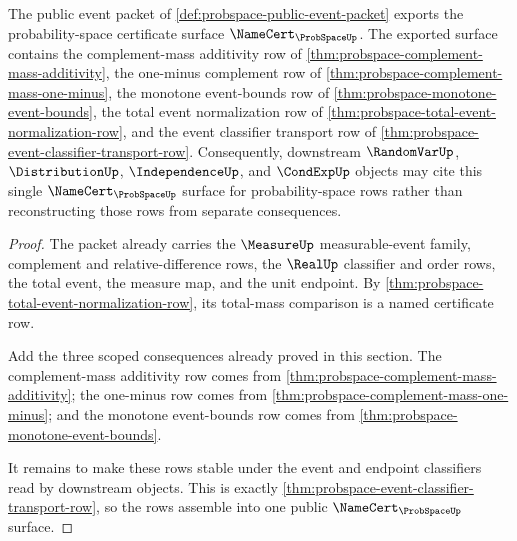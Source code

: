 \begin{theorem}
\label{thm:probspace-public-certificate-export}
The public event packet of \autoref{def:probspace-public-event-packet} exports the probability-space certificate surface $\NameCert_{\ProbSpaceUp}$. The exported surface contains the complement-mass additivity row of \autoref{thm:probspace-complement-mass-additivity}, the one-minus complement row of \autoref{thm:probspace-complement-mass-one-minus}, the monotone event-bounds row of \autoref{thm:probspace-monotone-event-bounds}, the total event normalization row of \autoref{thm:probspace-total-event-normalization-row}, and the event classifier transport row of \autoref{thm:probspace-event-classifier-transport-row}. Consequently, downstream $\RandomVarUp$, $\DistributionUp$, $\IndependenceUp$, and $\CondExpUp$ objects may cite this single $\NameCert_{\ProbSpaceUp}$ surface for probability-space rows rather than reconstructing those rows from separate consequences.
\end{theorem}
\begin{proof}
The packet already carries the $\MeasureUp$ measurable-event family, complement and relative-difference rows, the $\RealUp$ classifier and order rows, the total event, the measure map, and the unit endpoint. By \autoref{thm:probspace-total-event-normalization-row}, its total-mass comparison is a named certificate row.

Add the three scoped consequences already proved in this section. The complement-mass additivity row comes from \autoref{thm:probspace-complement-mass-additivity}; the one-minus row comes from \autoref{thm:probspace-complement-mass-one-minus}; and the monotone event-bounds row comes from \autoref{thm:probspace-monotone-event-bounds}.

It remains to make these rows stable under the event and endpoint classifiers read by downstream objects. This is exactly \autoref{thm:probspace-event-classifier-transport-row}, so the rows assemble into one public $\NameCert_{\ProbSpaceUp}$ surface.
\end{proof}

